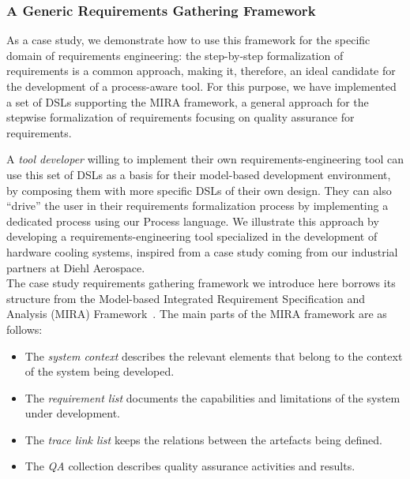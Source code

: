 \subsubsection{A Generic Requirements Gathering Framework}
\label{sec:generic_req_fram}

As a case study, we demonstrate how to use this framework for the
specific domain of requirements engineering: the step-by-step formalization of requirements is a common approach,
making it, therefore, an ideal candidate for the development of a process-aware tool.
For this purpose, we have implemented a set of DSLs supporting the MIRA
\cite{MIRA13} framework, a general approach for the stepwise formalization of requirements
focusing on quality assurance for requirements.

A \emph{tool developer} willing to implement their own requirements-engineering
tool can use this set of DSLs as a basis for their model-based development
environment, by composing them with more specific DSLs of their own design.
They can also ``drive'' the user in their requirements formalization process by
implementing a dedicated process using our \textsf{Process} language.
We illustrate this approach by developing a requirements-engineering tool
specialized in the development of hardware cooling systems, inspired
from a case study coming from our industrial partners at Diehl Aerospace.\\

The case study requirements gathering framework we introduce here borrows its
structure from the Model-based Integrated Requirement Specification and Analysis (MIRA)
Framework~\cite{MIRA13}. The main parts of the MIRA framework are
as follows:
\begin{itemize}
  \item The \emph{system context} describes the relevant elements that belong
  to the context of the system being developed.
  \item The \emph{requirement list} documents the capabilities and limitations
  of the system under development.
  \item The \emph{trace link list} keeps the relations between the artefacts
  being defined.
  \item The \emph{QA} collection describes quality assurance activities and
  results.
\end{itemize}

